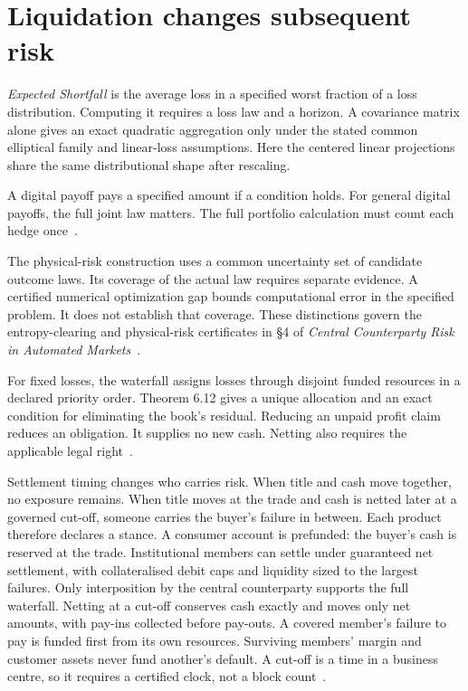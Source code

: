 \documentclass{momentum}
\begin{document}
\section{Liquidation changes subsequent risk}

\emph{Expected Shortfall} is the average loss in a specified worst fraction of a loss distribution. Computing it requires a loss law and a horizon. A covariance matrix alone gives an exact quadratic aggregation only under the stated common elliptical family and linear-loss assumptions. Here the centered linear projections share the same distributional shape after rescaling.

A digital payoff pays a specified amount if a condition holds. For general digital payoffs, the full joint law matters. The full portfolio calculation must count each hedge once~\cite[\S3]{ccp}.

The physical-risk construction uses a common uncertainty set of candidate outcome laws. Its coverage of the actual law requires separate evidence. A certified numerical optimization gap bounds computational error in the specified problem. It does not establish that coverage. These distinctions govern the entropy-clearing and physical-risk certificates in \S4 of \emph{Central Counterparty Risk in Automated Markets}~\cite{ccp}.

For fixed losses, the waterfall assigns losses through disjoint funded resources in a declared priority order. Theorem 6.12 gives a unique allocation and an exact condition for eliminating the book's residual. Reducing an unpaid profit claim reduces an obligation. It supplies no new cash. Netting also requires the applicable legal right~\cite[\S6]{ccp}.

Settlement timing changes who carries risk. When title and cash move together, no exposure remains. When title moves at the trade and cash is netted later at a governed cut-off, someone carries the buyer's failure in between. Each product therefore declares a stance. A consumer account is prefunded: the buyer's cash is reserved at the trade. Institutional members can settle under guaranteed net settlement, with collateralised debit caps and liquidity sized to the largest failures. Only interposition by the central counterparty supports the full waterfall. Netting at a cut-off conserves cash exactly and moves only net amounts, with pay-ins collected before pay-outs. A covered member's failure to pay is funded first from its own resources. Surviving members' margin and customer assets never fund another's default. A cut-off is a time in a business centre, so it requires a certified clock, not a block count~\cite[\S6]{ccp}.
\end{document}
